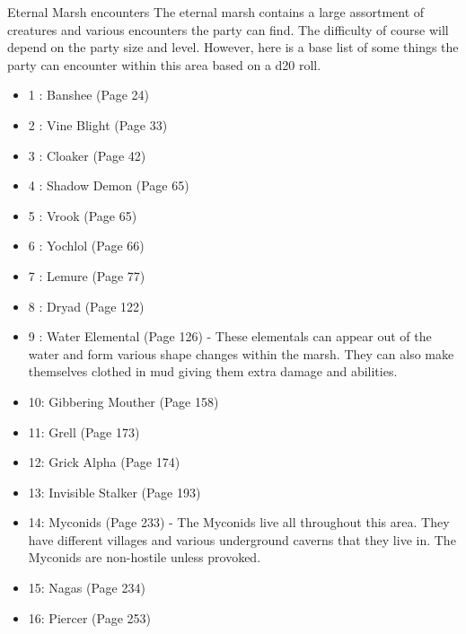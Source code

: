 \begin{commentbox}{Eternal Marsh encounters}
	The eternal marsh contains a large assortment of creatures and various encounters the party can find. The difficulty of course will depend on the party size and level. However, here is a base list of some things the party can encounter within this area based on a d20 roll.
	
	\begin{itemize}
		\item 1 : Banshee (Page 24) \\
		\item 2 : Vine Blight (Page 33) \\
		\item 3 : Cloaker (Page 42) \\
		\item 4 : Shadow Demon (Page 65)\\
		\item 5 : Vrook (Page 65)\\
		\item 6 : Yochlol (Page 66)\\
		\item 7 : Lemure (Page 77)\\
		\item 8 : Dryad (Page 122)\\
		\item 9 : Water Elemental (Page 126) - These elementals can appear out of the water and form various shape changes within the marsh. They can also make themselves clothed in mud giving them extra damage and abilities. \\
		\item 10: Gibbering Mouther (Page 158) \\
		\item 11: Grell (Page 173)\\
		\item 12: Grick Alpha (Page 174)\\
		\item 13: Invisible Stalker (Page 193)\\
		\item 14: Myconids (Page 233) - The Myconids live all throughout this area. They have different villages and various underground caverns that they live in. The Myconids are non-hostile unless provoked.\\
		\item 15: Nagas (Page 234)\\
		\item 16: Piercer (Page 253)\\

\end{itemize}
\end{commentbox}
